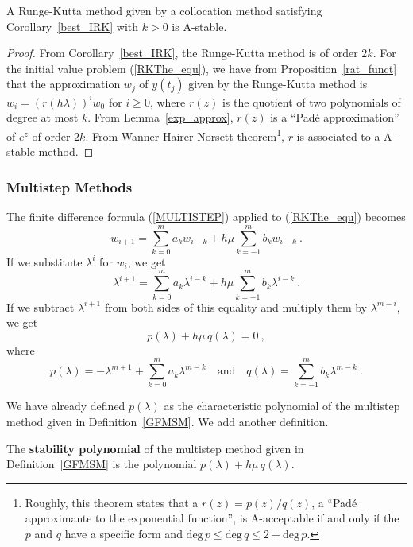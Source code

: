 \begin{theorem}
A Runge-Kutta method given by a collocation method satisfying
Corollary~\ref{best_IRK} with $k>0$ is A-stable.
\label{RKcolAstable}
\end{theorem}

\begin{proof}
From Corollary~\ref{best_IRK}, the Runge-Kutta method is of order
$2k$.  For the initial value problem (\ref{RKThe_equ}), we have from
Proposition~\ref{rat_funct} that the approximation $w_j$ of $y(t_j)$ given
by the Runge-Kutta method is $w_i = (r(h\lambda))^iw_0$ for $i\geq 0$,
where $r(z)$ is the quotient of two polynomials of degree at most $k$.
From Lemma~\ref{exp_approx}, $r(z)$ is a ``Pad\'e approximation'' of
$e^z$ of order $2k$.  From Wanner-Hairer-Norsett
theorem\footnote{Roughly, this theorem states that a $r(z) = p(z)/q(z)$,
a ``Pad\'e approximante to the exponential function'', is
A-acceptable if and only if the $p$ and $q$ have a specific form and
$\text{deg}\,p \leq \text{deg}\,q \leq 2 + \text{deg}\,p$.}, $r$ is
associated to a A-stable method.
\end{proof}

\subsubsection{Multistep Methods}

The finite difference formula (\ref{MULTISTEP})
applied to (\ref{RKThe_equ}) becomes
\[
w_{i+1} = \sum_{k=0}^m a_k w_{i-k} + h \mu \sum_{k=-1}^m b_k w_{i-k}\   .
\]
If we substitute $\lambda^i$ for $w_i$, we get
\[
  \lambda^{i+1} = \sum_{k=0}^m a_k \lambda^{i-k} + h \mu
  \sum_{k=-1}^m b_k \lambda^{i-k} \ .
\]
If we subtract $\lambda^{i+1}$ from both sides of this equality
and multiply them by $\lambda^{m-i}$, we get
\[
p(\lambda) +h\mu\, q(\lambda) = 0 \ ,
\]
where
\[
p(\lambda) = - \lambda^{m+1} + \sum_{k=0}^m a_k \lambda^{m-k}
\quad \text{and} \quad
q(\lambda) = \sum_{k=-1}^m  b_k \lambda^{m-k} \ .
\]

We have already defined $p(\lambda)$ as the characteristic polynomial
 of the multistep method given in
Definition~\ref{GFMSM}.  We add another definition.

\begin{defn}
The {\bfseries stability polynomial} of the
multistep method given in Definition~\ref{GFMSM}
is the polynomial $p(\lambda) + h\mu\, q(\lambda)$.
\end{defn}

